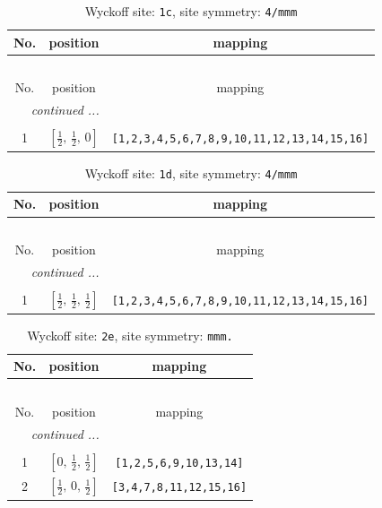 \documentclass[fleqn,8pt]{jsarticle}
\begin{document}
\begin{longtable}{ccc}
\caption{Wyckoff site: {\tt 1c}, site symmetry: {\tt 4/mmm}}
 \\
 \hline \hline
No. & position & mapping \\ \hline \endfirsthead

\multicolumn{2}{l}{\tablename\ \thetable{}} \\
 \hline \hline
No. & position & mapping \\ \hline \endhead

 \hline \hline
\multicolumn{2}{r}{\footnotesize\it continued ...} \\ \endfoot

 \hline \hline
\multicolumn{2}{r}{} \\ \endlastfoot

1 & $\left[ \frac{1}{2},\, \frac{1}{2},\, 0 \right]$ & {\tt [1,2,3,4,5,6,7,8,9,10,11,12,13,14,15,16]} \\
\end{longtable}
\renewcommand{\arraystretch}{1.2}
\begin{longtable}{ccc}
\caption{Wyckoff site: {\tt 1d}, site symmetry: {\tt 4/mmm}}
 \\
 \hline \hline
No. & position & mapping \\ \hline \endfirsthead

\multicolumn{2}{l}{\tablename\ \thetable{}} \\
 \hline \hline
No. & position & mapping \\ \hline \endhead

 \hline \hline
\multicolumn{2}{r}{\footnotesize\it continued ...} \\ \endfoot

 \hline \hline
\multicolumn{2}{r}{} \\ \endlastfoot

1 & $\left[ \frac{1}{2},\, \frac{1}{2},\, \frac{1}{2} \right]$ & {\tt [1,2,3,4,5,6,7,8,9,10,11,12,13,14,15,16]} \\
\end{longtable}
\renewcommand{\arraystretch}{1.2}
\begin{longtable}{ccc}
\caption{Wyckoff site: {\tt 2e}, site symmetry: {\tt mmm.}}
 \\
 \hline \hline
No. & position & mapping \\ \hline \endfirsthead

\multicolumn{2}{l}{\tablename\ \thetable{}} \\
 \hline \hline
No. & position & mapping \\ \hline \endhead

 \hline \hline
\multicolumn{2}{r}{\footnotesize\it continued ...} \\ \endfoot

 \hline \hline
\multicolumn{2}{r}{} \\ \endlastfoot

1 & $\left[ 0,\, \frac{1}{2},\, \frac{1}{2} \right]$ & {\tt [1,2,5,6,9,10,13,14]} \\ \hline
2 & $\left[ \frac{1}{2},\, 0,\, \frac{1}{2} \right]$ & {\tt [3,4,7,8,11,12,15,16]} \\
\end{longtable}
\end{document}

